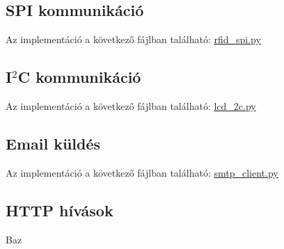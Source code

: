 \documentclass[11pt, a4paper]{article}
\begin{document}
		\subsection{SPI kommunikáció}
			\begin{flushleft}
				\justifying
				Az implementáció a következő fájlban található:
				\color{blue}
				\href{https://github.com/mark182182/GKLB_INTM020_mikroelektromechanikai_rendszerek/blob/main/raspi/rfid_spi.py}{rfid\_spi.py}
			\end{flushleft}
			
		\subsection{I$^2$C kommunikáció}
			\begin{flushleft}
				\justifying
				Az implementáció a következő fájlban található:
				\color{blue} \href{https://github.com/mark182182/GKLB_INTM020_mikroelektromechanikai_rendszerek/blob/main/raspi/lcd_i2c.py}{lcd\_2c.py}
			\end{flushleft}
		
		\subsection{Email küldés}
		\begin{flushleft}
			\justifying
			Az implementáció a következő fájlban található:
			\color{blue} \href{https://github.com/mark182182/GKLB_INTM020_mikroelektromechanikai_rendszerek/blob/main/smtp/smtp_client.py}{smtp\_client.py}
		\end{flushleft}	
			
			
		\subsection{HTTP hívások}
			\begin{flushleft}
				\justifying
				Baz
			\end{flushleft}
			
\end{document}
